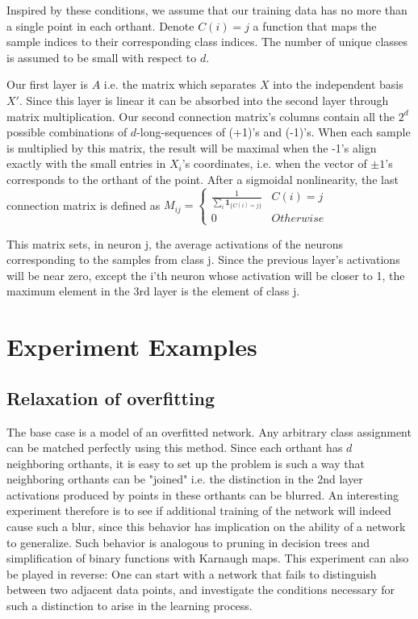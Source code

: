 \documentclass[]{article}
\begin{document}
 		Inspired by these conditions, we assume that our training data has no more than a single point in each orthant. Denote $C(i)=j$ a function that maps the sample indices to their corresponding class indices. The number of unique classes is assumed to be small with respect to $d$.
 		
		Our first layer is $A$ i.e. the matrix which separates $X$ into the independent basis $X'$. Since this layer is linear it can be absorbed into the second layer through matrix multiplication. Our second connection matrix's columns contain all the $2^d$ possible combinations of $d$-long-sequences of (+1)'s and (-1)'s. When each sample is multiplied by this matrix, the result will be maximal when the -1's align exactly with the small entries in $X_i$'s coordinates, i.e. when the vector of $\pm1$'s corresponds to the orthant of the point. After a sigmoidal nonlinearity, the last connection matrix is defined as 
		$M_{ij}=\begin{cases}
		 \frac{1}{\sum\limits_i \mathbf{1}_{\{C(i)=j\}}} & C(i)=j\\
		 0 & Otherwise
		 \end{cases}$
		 
		This matrix sets, in neuron j, the average activations of the neurons corresponding to the samples from class j. Since the previous layer's activations will be near zero, except the i'th neuron whose activation will be closer to 1, the maximum element in the 3rd layer is the element of class j.
		
	\section{Experiment Examples}
	\subsection{Relaxation of overfitting}
		The base case is a model of an overfitted network. Any arbitrary class assignment can be matched perfectly using this method. Since each orthant has $d$ neighboring orthants, it is easy to set up the problem is such a way that neighboring orthants can be "joined" i.e. the distinction in the 2nd layer activations produced by points in these orthants can be blurred. An interesting experiment therefore is to see if additional training of the network will indeed cause such a blur, since this behavior has implication on the ability of a network to generalize. Such behavior is analogous to pruning in decision trees and simplification of binary functions with Karnaugh maps.
		This experiment can also be played in reverse: One can start with a network that fails to distinguish between two adjacent data points, and investigate the conditions necessary for such a distinction to arise in the learning process.
\end{document}
